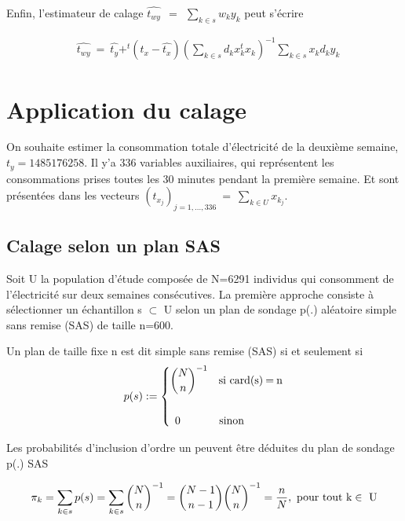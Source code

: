 \documentclass[11pt,fleqn]{book} %
\begin{document}
Enfin, l'estimateur de calage $ \hat{t_{wy}} \:\:=\:\:\sum_{k\in s} w_k y_k$ peut s'écrire

\begin{align}
&  \hat{t_{wy}} \:=\: \hat{t_y} + ^t(t_x-\hat{t_x}) \left( \sum_{k\in s} d_k x_k ^t x_k \right)^{-1}  \sum_{k\in s} x_k d_k y_k
\end{align}


\section{Application du calage}

On souhaite estimer la consommation totale d'électricité de la deuxième semaine, $t_y=1485176258$. Il y'a 336 variables auxiliaires, qui représentent les consommations  prises toutes les 30 minutes pendant la première semaine. Et sont présentées dans les vecteurs   $(t_{x_j})_{j=1,...,336} \:=\: \sum_{k\in U} x_{k_j}$. 

\subsection{Calage selon un plan SAS}

Soit U la population d'étude composée de N=6291 individus qui consomment de l'électricité sur deux semaines consécutives. La première approche consiste à sélectionner un échantillon s $\subset$ U selon un plan de sondage p(.) aléatoire simple sans remise (SAS) de taille n=600.

\begin{definition}
Un plan de taille fixe n est dit simple sans remise (SAS) si et seulement si
\begin{equation*}
p(s) :=\left\{\begin{aligned} & \binom{N}{n}^{-1} \quad \textnormal{si card(s)\:=\:n}\\
 \\ & \:\: 0  \quad\quad\quad\: \textnormal{ sinon} \end{aligned}\right.
\end{equation*}
\end{definition}

\begin{definition}
Les probabilités d'inclusion d'ordre un peuvent être déduites du plan de sondage p(.) SAS

\begin{equation*}
\pi_k=\sum_{k\in s} p(s)=\sum_{k\in s} \binom{N}{n}^{-1} = \binom{N-1}{n-1}\binom{N}{n}^{-1}=\frac{n}{N}, \textnormal{ pour tout k} \in \textnormal{ U}
\end{equation*}
\end{definition}
\end{document}
